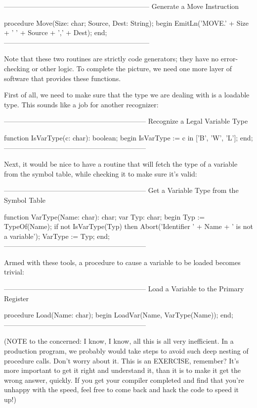 \documentclass[float=false, crop=false]{standalone}
\begin{document}
{---------------------------------------------------------------}
{ Generate a Move Instruction }

procedure Move(Size: char; Source, Dest: String);
begin
   EmitLn('MOVE.' + Size + ' ' + Source + ',' + Dest);
end;
{---------------------------------------------------------------}


Note that these two routines are strictly code generators; they have no
error-checking or other logic. To complete the picture, we need one more layer
of software that provides these functions.

First of all, we need to make sure that the type we are dealing with is a
loadable type. This sounds like a job for another recognizer:


{--------------------------------------------------------------}
{ Recognize a Legal Variable Type }

function IsVarType(c: char): boolean;
begin
   IsVarType := c in ['B', 'W', 'L'];
end;
{--------------------------------------------------------------}


Next, it would be nice to have a routine that will fetch the type of a variable
from the symbol table, while checking it to make sure it's valid:


{--------------------------------------------------------------}
{ Get a Variable Type from the Symbol Table }

function VarType(Name: char): char;
var Typ: char;
begin
   Typ := TypeOf(Name);
   if not IsVarType(Typ) then Abort('Identifier ' + Name +
                                        ' is not a variable');
   VarType := Typ;
end;
{--------------------------------------------------------------}


Armed with these  tools,  a  procedure  to cause a variable to be
loaded becomes trivial:


{--------------------------------------------------------------}
{ Load a Variable to the Primary Register }

procedure Load(Name: char);
begin
     LoadVar(Name, VarType(Name));
end;
{--------------------------------------------------------------}


(NOTE to the concerned: I know, I know, all this is all very inefficient. In a
production program, we probably would take steps to avoid such deep nesting of
procedure calls. Don't worry about it. This is an EXERCISE, remember? It's more
important to get it right and understand it, than it is to make it get the wrong
answer, quickly. If you get your compiler completed and find that you're unhappy
with the speed, feel free to come back and hack the code to speed it up!)
\end{document}

